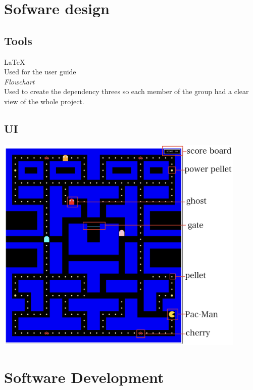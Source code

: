 \documentclass{article}
\begin{document}
 \section{Sofware design}
 \subsection{Tools}
 \hspace{0.5cm}\LaTeX \\
 Used for the user guide\\
 
 \textit{Flowchart}\\
 Used to create the dependency threes so each member of the group had a clear view of the whole project.
 

 \subsection{UI}
\begin{center}
\includegraphics[width=12cm]{./images/user_interface.png}
\end{center}

 \section{Software Development}
\end{document}
